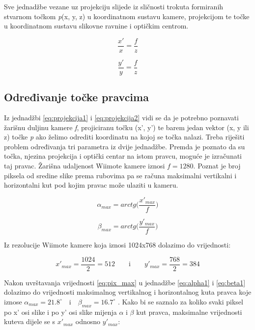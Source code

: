 \documentclass[times, utf8, diplomski]{fer}
\begin{document}
Sve jednadžbe vezane uz projekciju slijede iz sličnosti trokuta formiranih stvarnom točkom \textit{p}(x, y, z) u koordinatnom sustavu kamere, projekcijom te točke u koordinatnom sustavu slikovne ravnine i optičkim centrom.

\begin{equation}
\frac{x'}{x} = \frac{f}{z}
\label{eq:projekcija1}
\end{equation}

\begin{equation}
\frac{y'}{y} = \frac{f}{z}
\label{eq:projekcija2}
\end{equation}

\subsection{Određivanje točke pravcima}
Iz jednadžbi \ref{eq:projekcija1} i \ref{eq:projekcija2} vidi se da je potrebno poznavati žarišnu duljinu kamere \textit{f}, projiciranu točku (x', y') te barem jedan vektor (x, y ili z) točke \textit{p} ako želimo odrediti koordinatu na kojoj se točka nalazi. Treba riješiti problem određivanja tri parametra iz dvije jednadžbe. Premda je poznato da su točka, njezina projekcija i optički centar na istom pravcu, moguće je izračunati taj pravac. Žarišna udaljenost Wiimote kamere iznosi $f=1280$. Poznat je broj piksela od sredine slike prema rubovima pa se računa maksimalni vertikalni i horizontalni kut pod kojim pravac može ulaziti u kameru.

\begin{equation}
\alpha_{max} = arctg\bigg(\frac{x'_{max}}{f}\bigg)
\label{eq:alpha1}
\end{equation}

\begin{equation}
\beta_{max} = arctg\bigg(\frac{y'_{max}}{f}\bigg)
\label{eq:beta1}
\end{equation}

\vspace{5mm}

Iz rezolucije Wiimote kamere koja iznosi 1024x768 dolazimo do vrijednosti:

\begin{equation}
x'_{max} = \frac{1024}{2} = 512 \qquad\text{i}\qquad y'_{max} = \frac{768}{2} = 384
\label{eq:pix_max}
\end{equation}

\vspace{5mm}

Nakon uvrštavanja vrijednosti \ref{eq:pix_max} u jednadžbe \ref{eq:alpha1} i \ref{eq:beta1} dolazimo do vrijednosti maksimalnog vertikalnog i horizontalnog kuta pravca koje iznose $\alpha_{max} = 21.8^{\circ} \quad\text{i}\quad \beta_{max} = 16.7^{\circ}$ . Kako bi se saznalo za koliko svaki piksel po x' osi slike i po y' osi slike mijenja $\alpha$ i $\beta$ kut pravca, maksimalne vrijednosti kuteva dijele se s $x'_{max}$ odnosno $y'_{max}$:
\end{document}
